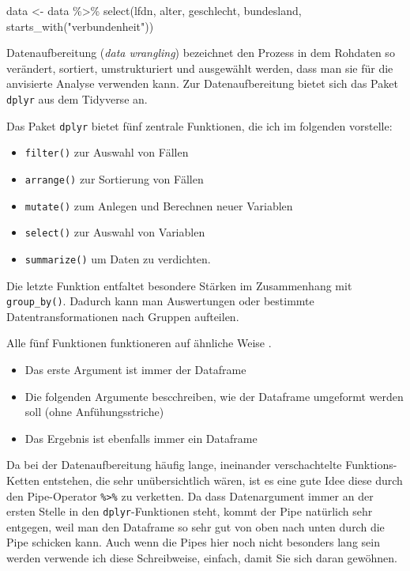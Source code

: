 \documentclass[
]{book}
\newenvironment{Shaded}{\begin{snugshade}}{\end{snugshade}}
\newcommand{\FunctionTok}[1]{\textcolor[rgb]{0.00,0.00,0.00}{#1}}
\newcommand{\NormalTok}[1]{#1}
\newcommand{\OtherTok}[1]{\textcolor[rgb]{0.56,0.35,0.01}{#1}}
\newcommand{\SpecialCharTok}[1]{\textcolor[rgb]{0.00,0.00,0.00}{#1}}
\newcommand{\StringTok}[1]{\textcolor[rgb]{0.31,0.60,0.02}{#1}}
\begin{document}
\begin{Shaded}
\begin{Highlighting}[]
\NormalTok{data }\OtherTok{\textless{}{-}}\NormalTok{ data }\SpecialCharTok{\%\textgreater{}\%} 
  \FunctionTok{select}\NormalTok{(lfdn, alter, geschlecht, bundesland, }\FunctionTok{starts\_with}\NormalTok{(}\StringTok{"verbundenheit"}\NormalTok{))}
\end{Highlighting}
\end{Shaded}

Datenaufbereitung (\emph{data wrangling}) bezeichnet den Prozess in dem Rohdaten so verändert, sortiert, umstrukturiert und ausgewählt werden, dass man sie für die anvisierte Analyse verwenden kann. Zur Datenaufbereitung bietet sich das Paket \texttt{dplyr} aus dem Tidyverse an.

Das Paket \texttt{dplyr} bietet fünf zentrale Funktionen, die ich im folgenden vorstelle:

\begin{itemize}
\item
  \texttt{filter()} zur Auswahl von Fällen
\item
  \texttt{arrange()} zur Sortierung von Fällen
\item
  \texttt{mutate()} zum Anlegen und Berechnen neuer Variablen
\item
  \texttt{select()} zur Auswahl von Variablen
\item
  \texttt{summarize()} um Daten zu verdichten.
\end{itemize}

Die letzte Funktion entfaltet besondere Stärken im Zusammenhang mit \texttt{group\_by()}. Dadurch kann man Auswertungen oder bestimmte Datentransformationen nach Gruppen aufteilen.

Alle fünf Funktionen funktioneren auf ähnliche Weise \citep[vgl.][Kap. 5.1.3]{Wickham_2017}.

\begin{itemize}
\item
  Das erste Argument ist immer der Dataframe
\item
  Die folgenden Argumente bescchreiben, wie der Dataframe umgeformt werden soll (ohne Anfühungsstriche)
\item
  Das Ergebnis ist ebenfalls immer ein Dataframe
\end{itemize}

Da bei der Datenaufbereitung häufig lange, ineinander verschachtelte Funktions-Ketten entstehen, die sehr unübersichtlich wären, ist es eine gute Idee diese durch den Pipe-Operator \texttt{\%\textgreater{}\%} zu verketten. Da dass Datenargument immer an der ersten Stelle in den \texttt{dplyr}-Funktionen steht, kommt der Pipe natürlich sehr entgegen, weil man den Dataframe so sehr gut von oben nach unten durch die Pipe schicken kann. Auch wenn die Pipes hier noch nicht besonders lang sein werden verwende ich diese Schreibweise, einfach, damit Sie sich daran gewöhnen.
\end{document}

